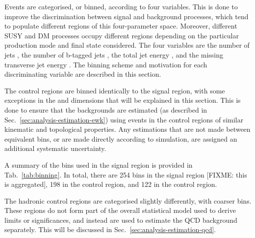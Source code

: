 Events are categorised, or binned, according to four variables. This is done to 
improve the discrimination between signal and background processes, which tend 
to populate different regions of this four-parameter space. Moreover, different 
SUSY and DM processes occupy different regions depending on the particular 
production mode and final state considered. The four variables are the number 
of jets \njet, the number of b-tagged jets \nb, the total jet energy \scalht, 
and the missing transverse jet energy \mht. The binning scheme and motivation 
for each discriminating variable are described in this section.

The control regions are binned identically to the signal region, with some 
exceptions in the \mht and \nb dimensions that will be explained in this 
section. This is done to ensure that the backgrounds are 
estimated (as described in Sec.~\ref{sec:analysis-estimation-ewk}) using events 
in the control regions of similar kinematic and topological properties. Any 
estimations that are not made between equivalent bins, or are made directly 
according to simulation, are assigned an additional systematic uncertainty.

A summary of the bins used in the signal region is provided in 
Tab.~\ref{tab:binning}.
In total, there are 254 bins in the signal region [FIXME: this is aggregated], 
198 in the \mj control 
region, and 122 in the \mmj control region.

The hadronic control regions are categorised slightly differently, with coarser 
bins. These regions do not form part of the overall statistical model used to 
derive limits or significances, and instead are used to estimate the QCD 
background separately. This will be discussed in 
Sec.~\ref{sec:analysis-estimation-qcd}.

